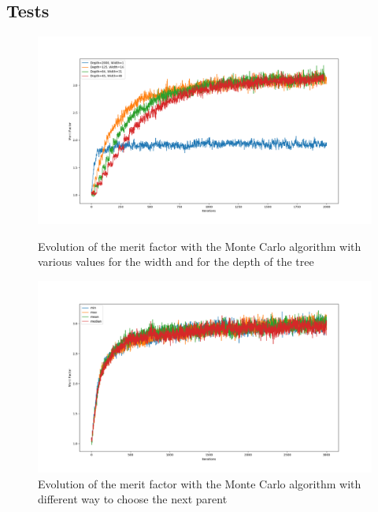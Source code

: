 \documentclass[a4paper,11pt,openany]{article}
\begin{document}
\subsection{Tests}
\begin{figure}[H]
\centering
\begin{minipage}{.45\textwidth}
  \begin{center}
  \includegraphics[scale=0.21]{Images/mc_width_depth}
  \caption{Evolution of the merit factor with the Monte Carlo algorithm with various values for the width and for the depth of the tree}
  \label{fig:mc_width_depth}
  \end{center}
\end{minipage}%
\hfill
\begin{minipage}{.45\textwidth}
  \begin{center}
  \includegraphics[scale=0.21]{Images/mc_merit_factor_back}
  \caption{Evolution of the merit factor with the Monte Carlo algorithm with different way to choose the next parent}
  \label{fig:mc_merit_factor_back}
  \end{center}
\end{minipage}
\end{figure}
\end{document}
